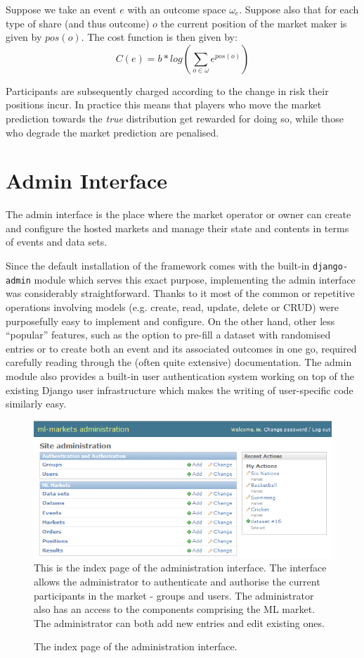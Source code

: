 \documentclass[bsc,frontabs,twoside,singlespacing,parskip,deptreport]{infthesis}     %
\begin{document}
\begin{itemize}
	Suppose we take an event $e$ with an outcome space $\omega_e$. Suppose also that for each type of share (and thus outcome) $o$ the current position of the market maker is given by $pos(o)$. The cost function is then given by:
$$C(e)=b*log(\sum_{o \in \omega} {e^{pos(o)}})$$

	Participants are subsequently charged according to the change in risk their positions incur. In practice this means that players who move the market prediction towards the {\it true} distribution get rewarded for doing so, while those who degrade the market prediction are penalised.

	


\section{Admin Interface}


    The admin interface is the place where the market operator or owner can create and configure the hosted markets and manage their state and contents in terms of events and data sets.

    Since the default installation of the framework comes with the built-in {\tt django-admin} module which serves this exact purpose, implementing the admin interface was considerably straightforward. Thanks to it most of the common or repetitive operations involving models (e.g. create, read, update, delete or CRUD) were purposefully easy to implement and configure. On the other hand, other less ``popular'' features, such as the option to pre-fill a dataset with randomised entries or to create both an event and its associated outcomes in one go, required carefully reading through the (often quite extensive) documentation. The admin module also provides a built-in user authentication system working on top of the existing Django user infrastructure which makes the writing of user-specific code similarly easy. 

\begin{figure}
 \caption{The index page of the administration interface. }
  \includegraphics[width=\textwidth]{figures/admin-index(c).png}
   \label{fig:admin-index}
{This is the index page of the administration interface. The interface allows the administrator to authenticate and authorise the current participants in the market -  groups and users. The administrator also has an access to the components comprising the ML market. The administrator can both add new entries and edit existing ones.}
\end{figure}


\end{itemize}
\end{document}

